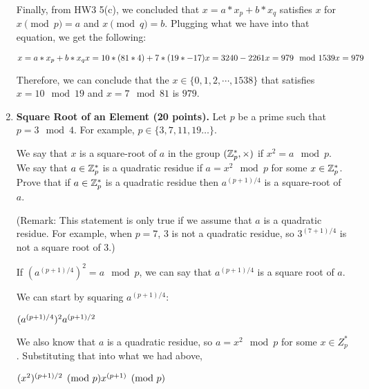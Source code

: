 \documentclass[11pt]{article}
\begin{document}
\begin{enumerate}
{  Finally, from HW3 5(c), we concluded that $x = a*x_p + b*x_q$ satisfies $x$ for $x\pmod p = a$ and $x\pmod q = b$. Plugging what we have into that equation, we get the following:

  $x = a*x_p + b*x_q \newline
  x = 10*(81*4) + 7*(19*-17) \newline
  x = 3240 - 2261 \newline
  x = 979 \mod 1539 \newline
  x = 979
  $ \newline

  Therefore, we can conclude that the $x\in \{0,1,2, \dotsi , 1538\}$ that satisfies $x=10\mod 19$ and $x=7\mod 81$ is $979$.
  }
     \newpage
  
  
 
   


\item {\bfseries Square Root of an Element (20 points).} 
  Let $p$ be a prime such that $p=3\mod 4$. 
  For example, $p\in\{3,7,11,19\dotsc\}.$
  
  We say that $x$ is a square-root of $a$ in the group $({\mathbb Z}_p^*,\times)$ if $x^2 = a\mod p$. We say that $a\in {\mathbb Z}_p^*$ is a quadratic residue if $a=x^2 \mod{p}$ for some $x\in {\mathbb Z}_p^*$. Prove that if $a\in {\mathbb Z}_p^*$ is a quadratic residue then $a^{(p+1)/4}$ is a square-root of $a$.
  
  (Remark: This statement is only true if we assume that $a$ is a quadratic residue. For example, when $p=7$, 3 is not a quadratic residue, so $3^{(7+1)/4}$ is not a square root of 3.)
  {\bfseries 
  \newline

  If $(a^{(p+1)/4})^2 = a\mod p$, we can say that $a^{(p+1)/4}$ is a square root of $a$.

  We can start by squaring $a^{(p+1)/4}$:

  $(a^{(p+1)/4})^2 \newline
  a^{(p+1)/2} \newline $

  We also know that $a$ is a quadratic residue, so $a = x^2\mod p$ for some $x\in Z_p^*$. Substituting that into what we had above,

  $(x^2)^{(p+1)/2} \pmod p \newline
  x^{(p+1)} \pmod p \newline
  $

}
\end{enumerate}
\end{document}
